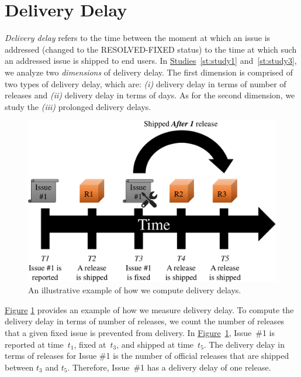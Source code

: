 \section{Delivery Delay}\label{ch2:deliverydelay}

{\em Delivery delay} refers to the time between the moment at which an issue is
addressed (\ie changed to the RESOLVED-FIXED status) to the time at which such
an addressed issue is shipped to end users. In 
\hyperref[st:study1]{Studies}~\ref{st:study1} and~\ref{st:study3}, we analyze
two {\em dimensions} of delivery delay. The first dimension is comprised of two
types of delivery delay, which are: {\em (i)} delivery delay in terms of number
of releases and {\em (ii)} delivery delay in terms of days. As for the second
dimension, we study the {\em (iii)} prolonged delivery delays.

\begin{figure}
	\centering
	\includegraphics[width=.80\textwidth,keepaspectratio]
	{chapters/chapter2/figures/integration_delay_releases.pdf}
	\caption{An illustrative example of how we compute delivery delays.}
	\label{fig:integration_delay_releases}
\end{figure}

\hyperref[fig:integration_delay_releases]{Figure}
\ref{fig:integration_delay_releases} provides an example of how we measure
delivery delay. To compute the delivery delay in terms of number of releases, we
count the number of releases that a given fixed issue is prevented from
delivery. In
\hyperref[fig:integration_delay_releases]{Figure}~\ref{fig:integration_delay_releases},
Issue~\#1 is reported at time~{\em $t_1$}, fixed at~{\em $t_3$}, and shipped at
time~{\em $t_5$}. The delivery delay in terms of releases for Issue \#1 is the
number of official releases that are shipped between {\em $t_3$} and {\em
$t_5$}. Therefore, Issue~\#1 has a delivery delay of one release. 

